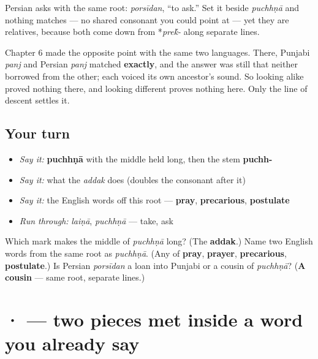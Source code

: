 \begin{culture}
Persian asks with the same root: \emph{porsīdan}, “to ask.” Set it beside \emph{puchhṇā} and nothing matches — no shared consonant you could point at — yet they are relatives, because both come down from *\emph{pre\'{k}-} along separate lines.

Chapter 6 made the opposite point with the same two languages. There, Punjabi \emph{panj} and Persian \emph{panj} matched \textbf{exactly}, and the answer was still that neither borrowed from the other; each voiced its own ancestor's sound. So looking alike proved nothing there, and looking different proves nothing here. Only the line of descent settles it.
\end{culture}

\subsection*{Your turn}
\begin{itemize}
\raggedright
  \item \emph{Say it:} \textbf{puchhṇā} with the middle held long, then the stem \textbf{puchh-}
  \item \emph{Say it:} what the \emph{addak} does (doubles the consonant after it)
  \item \emph{Say it:} the English words off this root — \textbf{pray}, \textbf{precarious}, \textbf{postulate}
  \item \emph{Run through:} \emph{laiṇā}, \emph{puchhṇā} — take, ask
\end{itemize}

\begin{tcolorbox}[breakable,colback=teal!4,colframe=teal!35!black,title={Before you move on}]
Which mark makes the middle of \emph{puchhṇā} long? (The \textbf{addak}.) Name two English words from the same root as \emph{puchhṇā}. (Any of \textbf{pray}, \textbf{prayer}, \textbf{precarious}, \textbf{postulate}.) Is Persian \emph{porsīdan} a loan into Punjabi or a cousin of \emph{puchhṇā}? (\textbf{A cousin} — same root, separate lines.)
\end{tcolorbox}
\section[\texorpdfstring{\pa{ੁ} · \pa{ੰ} (-u · (nasal))}{ੁ · ੰ (-u · (nasal))}]{ ·  — two pieces met inside a word you already say}

\label{lesson:PA-S09-aunkar-tippi}



